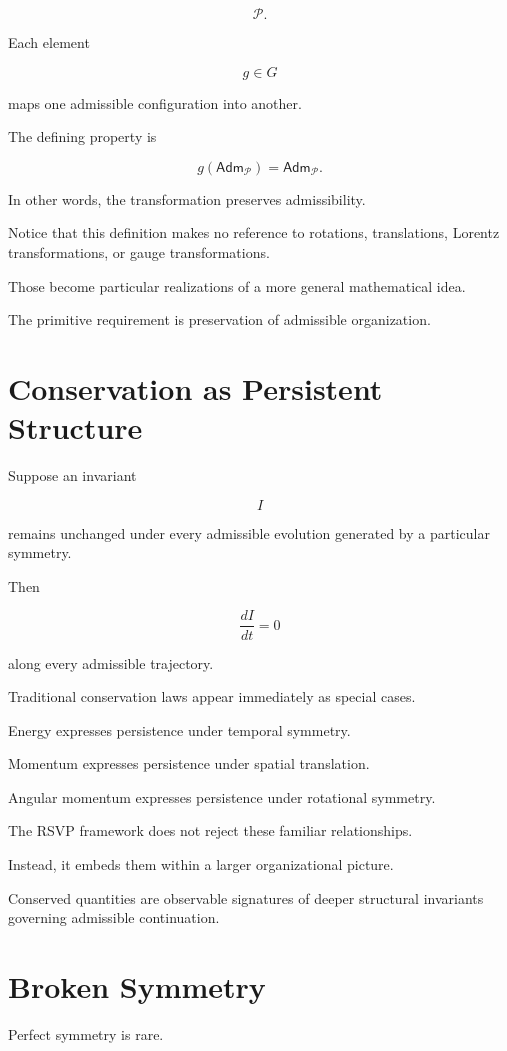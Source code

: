 \documentclass[11pt,oneside]{book}
\numberwithin{equation}{chapter}
\theoremstyle{definition}
\theoremstyle{plain}
\newcommand{\Adm}{\mathsf{Adm}}
\begin{document}
\[
\mathcal P.
\]

Each element

\[
g\in G
\]

maps one admissible configuration into another.

The defining property is

\[
g(\Adm_{\mathcal P})
=
\Adm_{\mathcal P}.
\]

In other words, the transformation preserves admissibility.

Notice that this definition makes no reference to rotations, translations,
Lorentz transformations, or gauge transformations.

Those become particular realizations of a more general mathematical idea.

The primitive requirement is preservation of admissible organization.

\section{Conservation as Persistent Structure}

Suppose an invariant

\[
I
\]

remains unchanged under every admissible evolution generated by a particular
symmetry.

Then

\[
\frac{dI}{dt}=0
\]

along every admissible trajectory.

Traditional conservation laws appear immediately as special cases.

Energy expresses persistence under temporal symmetry.

Momentum expresses persistence under spatial translation.

Angular momentum expresses persistence under rotational symmetry.

The RSVP framework does not reject these familiar relationships.

Instead, it embeds them within a larger organizational picture.

Conserved quantities are observable signatures of deeper structural
invariants governing admissible continuation.

\section{Broken Symmetry}

Perfect symmetry is rare.
\end{document}
